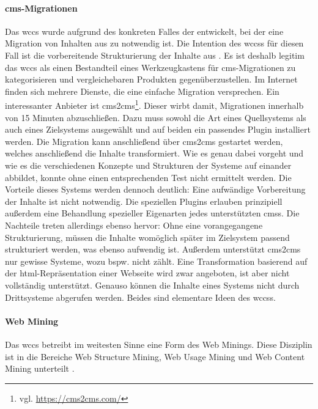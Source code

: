         \paragraph{\gls{cms}-Migrationen}
        Das \gls{wccs} wurde aufgrund des konkreten Falles der {\fernUni}
        entwickelt, bei der eine Migration von Inhalten aus {\wordpress} zu {\imperia} notwendig ist.
        Die Intention des \glspl{wccs} für diesen Fall ist die vorbereitende Strukturierung der
        Inhalte aus {\wordpress}.
        Es ist deshalb legitim das \gls{wccs} als einen Bestandteil eines Werkzeugkastens
        für \gls{cms}-Migrationen zu kategorisieren und vergleichebaren Produkten gegenüberzustellen.
        Im Internet finden sich mehrere Dienste, die eine einfache Migration versprechen.
        Ein interessanter Anbieter ist cms2cms\footnote{vgl. \url{https://cms2cms.com/}}.
        Dieser wirbt damit, Migrationen innerhalb von 15 Minuten abzuschließen.
        Dazu muss sowohl die Art eines Quellsystems als auch eines Zielsystems ausgewählt
        und auf beiden ein passendes Plugin installiert werden.
        Die Migration kann anschließend über cms2cms gestartet werden,
        welches anschließend die Inhalte transformiert.
        Wie es genau dabei vorgeht und wie es die verschiedenen Konzepte und Strukturen
        der Systeme auf einander abbildet, konnte ohne einen entsprechenden Test nicht ermittelt werden.
        Die Vorteile dieses Systems werden dennoch deutlich:
        Eine aufwändige Vorbereitung der Inhalte ist nicht notwendig.
        Die speziellen Plugins erlauben prinzipiell außerdem eine Behandlung spezieller
        Eigenarten jedes unterstützten \glspl{cms}.
        Die Nachteile treten allerdings ebenso hervor: Ohne eine vorangegangene Strukturierung,
        müssen die Inhalte womöglich später im Zielsystem passend strukturiert werden,
        was ebenso aufwendig ist.
        Außerdem unterstützt cms2cms nur gewisse Systeme,
        wozu bspw. {\imperia} nicht zählt.
        Eine Transformation basierend auf der \gls{html}-Repräsentation einer Webseite wird zwar angeboten,
        ist aber nicht vollständig unterstützt.
        Genauso können die Inhalte eines Systems nicht durch Drittsysteme abgerufen werden.
        Beides sind elementare Ideen des \glspl{wccs}.

        \paragraph{Web Mining}
        Das \gls{wccs} betreibt im weitesten Sinne eine Form des Web Minings.
        Diese Disziplin ist in die Bereiche Web Structure Mining,
        Web Usage Mining und Web Content Mining unterteilt
        \cite{markov:webMining}.

